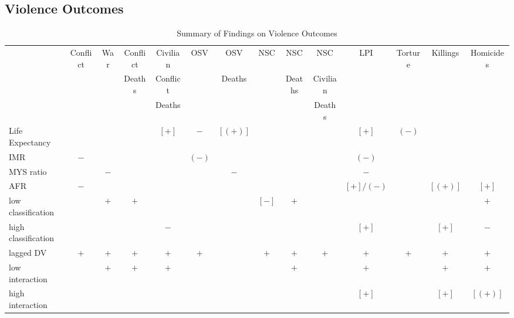 \documentclass[12pt]{article}
\begin{document}
\subsection{Violence Outcomes}


\begin{table}
\small
\centering
\caption{Summary of Findings on Violence Outcomes}
\label{table_panel_violence}
\begin{tabular}{lc|c|c|c|c|c|c|c|c|c|c|c|c}

\toprule
                    & Conflict & War & Conflict & Civilian & OSV   & OSV     & NSC   & NSC    & NSC      & LPI       & Torture & Killings & Homicides \\
                    &          &     & Deaths   & Conflict &       & Deaths  &       & Deaths & Civilian &           &         &          & \\
                    &          &     &          & Deaths   &       &         &       &        & Deaths   &           &         &          & \\
\midrule
Life Expectancy     &          &     &          & $[+]$    & $-$   & $[(+)]$ &       &        &          & $[+]$     & $(-)$   &          & \\
IMR                 & $-$      &     &          &          & $(-)$ &         &       &        &          & $(-)$     &         &          & \\
MYS ratio           &          & $-$ &          &          &       & $-$     &       &        &          & $-$       &         &          & \\
AFR                 & $-$      &     &          &          &       &         &       &        &          & $[+]/(-)$ &         & $[(+)]$  & $[+]$ \\
low classification  &          & $+$ & $+$      &          &       &         & $[-]$ & $+$    &          &           &         &          & $+$ \\
high classification &          &     &          & $-$      &       &         &       &        &          & $[+]$     &         & $[+]$    & $-$ \\
lagged DV           & $+$      & $+$ & $+$      & $+$      & $+$   &         & $+$   & $+$    & $+$      & $+$       & $+$     & $+$      & $+$ \\
\qquad low interaction     &          & $+$ & $+$      & $+$      &       &         &       & $+$    &          & $+$       &         & $+$      & $+$ \\
\qquad high interaction    &          &     &          &          &       &         &       &        &          & $[+]$     &         & $[+]$    & $[(+)]$ \\
\bottomrule
\end{tabular}
\end{table}
\end{document}
